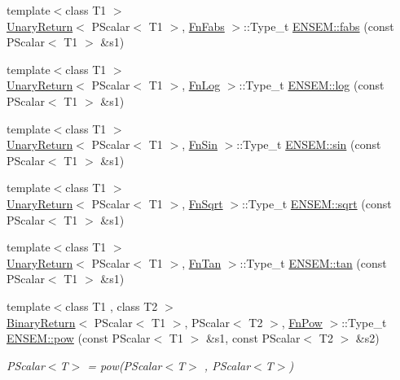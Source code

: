\begin{DoxyCompactItemize}
{\footnotesize template$<$class T1 $>$ }\\\mbox{\hyperlink{structUnaryReturn}{Unary\+Return}}$<$ P\+Scalar$<$ T1 $>$, \mbox{\hyperlink{structFnFabs}{Fn\+Fabs}} $>$\+::Type\+\_\+t \mbox{\hyperlink{group__primscalar_ga974d25e3b2bee6a839ad06b019932122}{E\+N\+S\+E\+M\+::fabs}} (const P\+Scalar$<$ T1 $>$ \&s1)
\item 
{\footnotesize template$<$class T1 $>$ }\\\mbox{\hyperlink{structUnaryReturn}{Unary\+Return}}$<$ P\+Scalar$<$ T1 $>$, \mbox{\hyperlink{structFnLog}{Fn\+Log}} $>$\+::Type\+\_\+t \mbox{\hyperlink{group__primscalar_ga4793657c8e42b217f973ede3c83b71d7}{E\+N\+S\+E\+M\+::log}} (const P\+Scalar$<$ T1 $>$ \&s1)
\item 
{\footnotesize template$<$class T1 $>$ }\\\mbox{\hyperlink{structUnaryReturn}{Unary\+Return}}$<$ P\+Scalar$<$ T1 $>$, \mbox{\hyperlink{structFnSin}{Fn\+Sin}} $>$\+::Type\+\_\+t \mbox{\hyperlink{group__primscalar_gaa9443eab6edf0a2d0c707614f108a8e3}{E\+N\+S\+E\+M\+::sin}} (const P\+Scalar$<$ T1 $>$ \&s1)
\item 
{\footnotesize template$<$class T1 $>$ }\\\mbox{\hyperlink{structUnaryReturn}{Unary\+Return}}$<$ P\+Scalar$<$ T1 $>$, \mbox{\hyperlink{structFnSqrt}{Fn\+Sqrt}} $>$\+::Type\+\_\+t \mbox{\hyperlink{group__primscalar_ga07f86503a0138d56e1948dd554ec3e10}{E\+N\+S\+E\+M\+::sqrt}} (const P\+Scalar$<$ T1 $>$ \&s1)
\item 
{\footnotesize template$<$class T1 $>$ }\\\mbox{\hyperlink{structUnaryReturn}{Unary\+Return}}$<$ P\+Scalar$<$ T1 $>$, \mbox{\hyperlink{structFnTan}{Fn\+Tan}} $>$\+::Type\+\_\+t \mbox{\hyperlink{group__primscalar_gac184e021b0af3d450c4db8f1a8fd75dc}{E\+N\+S\+E\+M\+::tan}} (const P\+Scalar$<$ T1 $>$ \&s1)
\item 
{\footnotesize template$<$class T1 , class T2 $>$ }\\\mbox{\hyperlink{structBinaryReturn}{Binary\+Return}}$<$ P\+Scalar$<$ T1 $>$, P\+Scalar$<$ T2 $>$, \mbox{\hyperlink{structFnPow}{Fn\+Pow}} $>$\+::Type\+\_\+t \mbox{\hyperlink{group__primscalar_ga28323c8753f21f37983319d38eea45ee}{E\+N\+S\+E\+M\+::pow}} (const P\+Scalar$<$ T1 $>$ \&s1, const P\+Scalar$<$ T2 $>$ \&s2)
\begin{DoxyCompactList}\small\item\em P\+Scalar$<$\+T$>$ = pow(\+P\+Scalar$<$\+T$>$ , P\+Scalar$<$\+T$>$) \end{DoxyCompactList}\item 

\end{DoxyCompactItemize}
